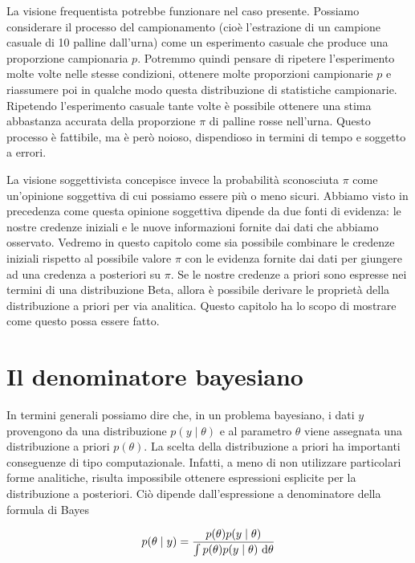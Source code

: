 \documentclass[
  11pt,
]{krantz}
\theoremstyle{definition}
\theoremstyle{definition}
\theoremstyle{definition}
\theoremstyle{definition}
\theoremstyle{remark}
\begin{document}
La visione frequentista potrebbe funzionare nel caso presente. Possiamo considerare il processo del campionamento (cioè l'estrazione di un campione casuale di 10 palline dall'urna) come un esperimento casuale che produce una proporzione campionaria \(p\). Potremmo quindi pensare di ripetere l'esperimento molte volte nelle stesse condizioni, ottenere molte proporzioni campionarie \(p\) e riassumere poi in qualche modo questa distribuzione di statistiche campionarie. Ripetendo l'esperimento casuale tante volte è possibile ottenere una stima abbastanza accurata della proporzione \(\pi\) di palline rosse nell'urna. Questo processo è fattibile, ma è però noioso, dispendioso in termini di tempo e soggetto a errori.

La visione soggettivista concepisce invece la probabilità sconosciuta \(\pi\) come un'opinione soggettiva di cui possiamo essere più o meno sicuri. Abbiamo visto in precedenza come questa opinione soggettiva dipende da due fonti di evidenza: le nostre credenze iniziali e le nuove informazioni fornite dai dati che abbiamo osservato. Vedremo in questo capitolo come sia possibile combinare le credenze iniziali rispetto al possibile valore \(\pi\) con le evidenza fornite dai dati per giungere ad una credenza a posteriori su \(\pi\). Se le nostre credenze a priori sono espresse nei termini di una distribuzione Beta, allora è possibile derivare le proprietà della distribuzione a priori per via analitica. Questo capitolo ha lo scopo di mostrare come questo possa essere fatto.

\hypertarget{il-denominatore-bayesiano}{%
\section{Il denominatore bayesiano}\label{il-denominatore-bayesiano}}

In termini generali possiamo dire che, in un problema bayesiano, i dati \(y\) provengono da una distribuzione \(p(y \mid \theta)\) e al parametro \(\theta\) viene assegnata una distribuzione a priori \(p(\theta)\). La scelta della distribuzione a priori ha importanti conseguenze di tipo computazionale. Infatti, a meno di non utilizzare particolari forme analitiche, risulta impossibile ottenere espressioni esplicite per la distribuzione a posteriori. Ciò dipende dall'espressione a denominatore della formula di Bayes

\begin{equation}
p(\theta \mid y) = \frac{p(\theta) p(y \mid \theta)}{\int p(\theta) p(y \mid \theta) \,\operatorname {d}\! \theta} \notag
\end{equation}
\end{document}
